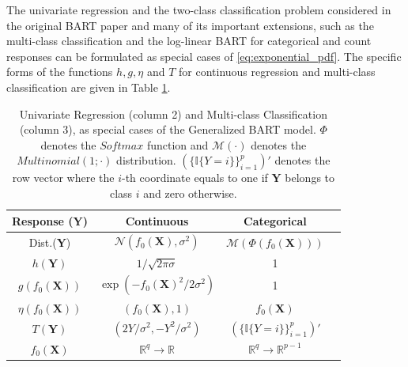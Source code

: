 \documentclass[12pt]{article}
\newcommand{\bm}[1]{\boldsymbol{#1}}
\newcommand{\Y}{\bm{Y}}
\newcommand{\1}{\mathbb{I}}
\def\Y{\bm{Y}}
\def\X{\bm{X}}
\def\X{\mbox{\boldmath$X$}}
\renewcommand{\Y}{\bm{Y}}
\def\X{\bm{X}}
\theoremstyle{plain}
\theoremstyle{definition}
\theoremstyle{remark}
\begin{document}
The univariate regression and the two-class classification problem considered in the original BART paper \citep{chipman2010bart} and many of its important extensions, such as the multi-class classification and the log-linear BART \citep{murray2017log} for categorical and count responses can be formulated as special cases of \eqref{eq:exponential_pdf}. The specific forms of the functions $h, g, \eta$ and $T$ for continuous regression and multi-class classification are given in Table \ref{tab: exponential_table}.

\begin{table}[t]
\caption[Some Examples of Generalized BART Model]{ Univariate Regression (column 2) and Multi-class Classification (column 3), as special cases of the Generalized BART model. $\Phi$ denotes the $Softmax$ function and $\mathcal{M}(\cdot)$ denotes the $Multinomial(1;\cdot)$ distribution. $\left(\{\mathbb{I}\{Y=i\}\}_{i=1}^{p} \right)'$ denotes the row vector where the $i$-th coordinate equals to one if $\Y$ belongs to class $i$ and zero otherwise.  }
\label{tab: exponential_table}
\begin{center}
\begin{small}
\begin{tabular}{cccc}
\toprule
         Response ($\Y$)  & Continuous & Categorical \\
\midrule
Dist.($\Y$)  &     $\mathcal{N}\left (f_0(\X), \sigma^2 \right )$     & $\mathcal{M}\left(\Phi(f_0(\X))\right)$ \\ 
$h(\Y)$   &        $ 1/\sqrt{2\pi \sigma}$   & 1   \\ 
$g\left(f_0(\X)\right)$   &  $\exp\left ( -f_0(\X)^2/2\sigma^2 \right)$     & 1  \\ 
$\eta\left(f_0(\X) \right)$   &  $\left (f_0(\X), 1 \right )$           & $f_0(\X)$            \\ 
$T(\Y)$   &  $\left (2Y/\sigma^2, - Y^2/\sigma^2 \right )$                  & $\left(\{\mathbb{I}\{Y=i\}\}_{i=1}^{p} \right)'$  \\
$f_0(\X)$   &  $\mathbb{R}^q \rightarrow \mathbb{R}$               & $\mathbb{R}^q \rightarrow \mathbb{R}^{p-1}$        \\
\bottomrule
\end{tabular}
\end{small}
\end{center}
\vskip -0.1in
\end{table}
\end{document}
